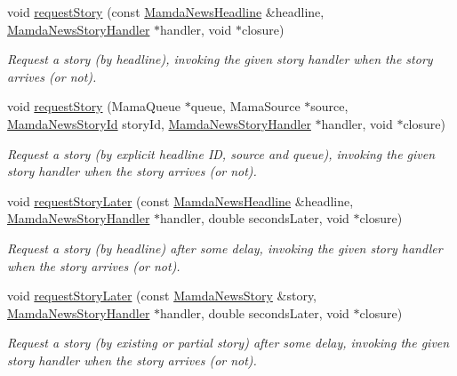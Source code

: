 \begin{CompactItemize}
void \hyperlink{classWombat_1_1MamdaNewsManager_bcefa38c01848fdaf6e126fb999f271a}{request\-Story} (const \hyperlink{classWombat_1_1MamdaNewsHeadline}{Mamda\-News\-Headline} \&headline, \hyperlink{classWombat_1_1MamdaNewsStoryHandler}{Mamda\-News\-Story\-Handler} $\ast$handler, void $\ast$closure)
\begin{CompactList}\small\item\em Request a story (by headline), invoking the given story handler when the story arrives (or not). \item\end{CompactList}\item 
void \hyperlink{classWombat_1_1MamdaNewsManager_7af48a00fc94e2ccbb6d9da13561e975}{request\-Story} (Mama\-Queue $\ast$queue, Mama\-Source $\ast$source, \hyperlink{namespaceWombat_f7b94f4bb44eb78420c0d3ba0413424e}{Mamda\-News\-Story\-Id} story\-Id, \hyperlink{classWombat_1_1MamdaNewsStoryHandler}{Mamda\-News\-Story\-Handler} $\ast$handler, void $\ast$closure)
\begin{CompactList}\small\item\em Request a story (by explicit headline ID, source and queue), invoking the given story handler when the story arrives (or not). \item\end{CompactList}\item 
void \hyperlink{classWombat_1_1MamdaNewsManager_737d88d1fcb9731a9ba4aed3e6f1c901}{request\-Story\-Later} (const \hyperlink{classWombat_1_1MamdaNewsHeadline}{Mamda\-News\-Headline} \&headline, \hyperlink{classWombat_1_1MamdaNewsStoryHandler}{Mamda\-News\-Story\-Handler} $\ast$handler, double seconds\-Later, void $\ast$closure)
\begin{CompactList}\small\item\em Request a story (by headline) after some delay, invoking the given story handler when the story arrives (or not). \item\end{CompactList}\item 
void \hyperlink{classWombat_1_1MamdaNewsManager_ee0f08106c9f680336cd65b197895d24}{request\-Story\-Later} (const \hyperlink{classWombat_1_1MamdaNewsStory}{Mamda\-News\-Story} \&story, \hyperlink{classWombat_1_1MamdaNewsStoryHandler}{Mamda\-News\-Story\-Handler} $\ast$handler, double seconds\-Later, void $\ast$closure)
\begin{CompactList}\small\item\em Request a story (by existing or partial story) after some delay, invoking the given story handler when the story arrives (or not). \item\end{CompactList}\item 

\end{CompactItemize}
